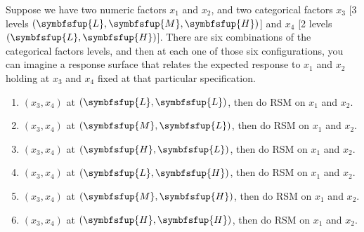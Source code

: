 \begin{itemize}
        \begin{Example}{}
            Suppose we have two numeric factors $ x_1 $ and $ x_2 $, and two categorical factors $ x_3 $ [3 levels $(\symbfsfup{L}, \symbfsfup{M}, \symbfsfup{H})$] and
            $ x_4 $ [2 levels $(\symbfsfup{L}, \symbfsfup{H})$]. There are six combinations of the categorical factors levels, and then at each one of those six configurations,
            you can imagine a response surface that relates the expected response to $ x_1 $ and $ x_2 $ holding at $ x_3 $ and $ x_4 $ fixed at that particular specification.
            \begin{enumerate}[1.]
                \item $ (x_3,x_4) $ at $(\symbfsfup{L},\symbfsfup{L})$, then do RSM on $ x_1 $ and $ x_2 $.
                \item $ (x_3,x_4) $ at $(\symbfsfup{M},\symbfsfup{L})$, then do RSM on $ x_1 $ and $ x_2 $.
                \item $ (x_3,x_4) $ at $(\symbfsfup{H},\symbfsfup{L})$, then do RSM on $ x_1 $ and $ x_2 $.
                \item $ (x_3,x_4) $ at $(\symbfsfup{L},\symbfsfup{H})$, then do RSM on $ x_1 $ and $ x_2 $.
                \item $ (x_3,x_4) $ at $(\symbfsfup{M},\symbfsfup{H})$, then do RSM on $ x_1 $ and $ x_2 $.
                \item $ (x_3,x_4) $ at $(\symbfsfup{H},\symbfsfup{H})$, then do RSM on $ x_1 $ and $ x_2 $.
            \end{enumerate}
        \end{Example}
\end{itemize}
